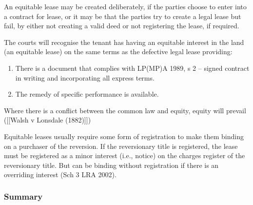 \documentclass[
]{article}
\newenvironment{Shaded}{}{}
\newcommand{\NormalTok}[1]{#1}
\providecommand{\tightlist}{%
  \setlength{\itemsep}{0pt}\setlength{\parskip}{0pt}}
\begin{document}
An equitable lease may be created deliberately, if the parties choose to
enter into a contract for lease, or it may be that the parties try to
create a legal lease but fail, by either not creating a valid deed or
not registering the lease, if required.

The courts will recognise the tenant has having an equitable interest in
the land (an equitable lease) on the same terms as the defective legal
lease providing:

\begin{enumerate}
\def\labelenumi{\arabic{enumi}.}
\tightlist
\item
  There is a document that complies with LP(MP)A 1989, s 2 -- signed
  contract in writing and incorporating all express terms.
\item
  The remedy of specific performance is available.
\end{enumerate}

\begin{Shaded}
\begin{Highlighting}[]
\NormalTok{Where there is a conflict between the common law and equity, equity will prevail ([[Walsh v Lonsdale (1882)]])}
\end{Highlighting}
\end{Shaded}

Equitable leases usually require some form of registration to make them
binding on a purchaser of the reversion. If the reversionary title is
registered, the lease must be registered as a minor interest (i.e.,
notice) on the charges register of the reversionary title. But can be
binding without registration if there is an overriding interest (Sch 3
LRA 2002).

\hypertarget{summary}{%
\subsubsection{Summary}\label{summary}}
\end{document}
